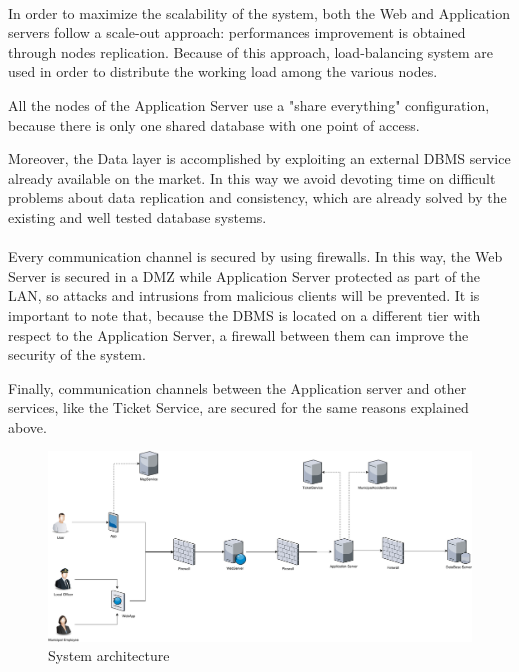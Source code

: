			\paragraph{}
				In order to maximize the scalability of the system, both the Web and Application servers follow a scale-out approach: performances improvement is obtained through nodes replication. Because of this approach, load-balancing system are used in order to distribute the working load among the various nodes. 
				
				All the nodes of the Application Server use a "share everything" configuration, because there is only one shared database with one point of access. 
				
				Moreover, the Data layer is accomplished by exploiting an external DBMS service already available on the market. In this way we avoid devoting time on difficult problems about data replication and consistency, which are already solved by the existing and well tested database systems.
			\paragraph{}
				Every communication channel is secured by using firewalls. In this way, the Web Server is secured in a DMZ while Application Server protected as part of the LAN, so attacks and intrusions from malicious  clients will be prevented. It is important to note that, because the DBMS is located on a different tier with respect to the Application Server, a firewall between them can improve the security of the system.
				
				Finally, communication channels between the Application server and other services, like the Ticket Service, are secured for the same reasons explained above.
				\begin{figure}[!h]
					\centering
					\includegraphics[width=\textwidth]{images/DD2/SystemArchitecture.pdf}
					\caption{System architecture}
				\end{figure}
		\clearpage
